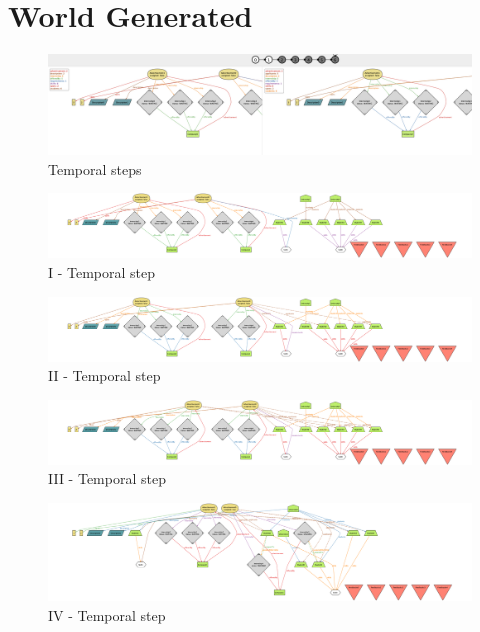 \section{World Generated}

\begin{figure}[H]
    \centering
    \includegraphics[width=450px]{../../assets/alloy-world/world-steps.png}
    \caption*{Temporal steps}
\end{figure}

\begin{figure}[H]
    \centering
    \includegraphics[width=450px]{../../assets/alloy-world/I-step.png}
    \caption*{I - Temporal step}
\end{figure}

\begin{figure}[H]
    \centering
    \includegraphics[width=450px]{../../assets/alloy-world/II-step.png}
     \caption*{II - Temporal step}
\end{figure}

\begin{figure}[H]
    \centering
    \includegraphics[width=450px]{../../assets/alloy-world/III-step.png}
    \caption*{III - Temporal step}
\end{figure}

\begin{figure}[H]
    \centering
    \includegraphics[width=450px]{../../assets/alloy-world/IV-step.png}
    \caption*{IV - Temporal step}
\end{figure}

